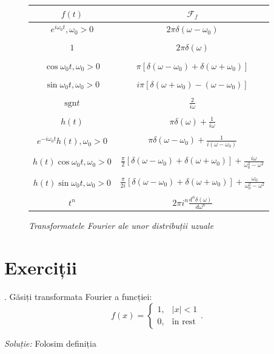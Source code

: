 \documentclass[12pt,a4paper]{article}
\newcommand\kal{\mathcal}
\theoremstyle{dotless}
\theoremstyle{dotlessdr}
\begin{document}
\begin{figure}[!htbp]
  \centering
  \begin{tabular}{|c|c|}
    $ f(t) $ & $ \kal{F}_f $ \\
    \hline\hline
    $ e^{i \omega_0 t}, \omega_0 > 0 $ & $ 2 \pi \delta(\omega - \omega_0) $ \\ & \\
    $ 1 $ & $ 2 \pi \delta(\omega) $ \\ & \\
    $ \cos \omega_0 t, \omega_0 > 0 $ & $ \pi[\delta(\omega - \omega_0) + \delta(\omega + \omega_0)] $ \\ & \\
    $ \sin \omega_0 t, \omega_0 > 0 $ & $ i\pi[\delta(\omega + \omega_0) - (\omega - \omega_0)] $ \\ & \\
    $ \mathrm{sgn} t$ & $ \frac{2}{i \omega} $ \\ & \\
    $ h(t) $ & $ \pi \delta(\omega) + \frac{1}{i \omega} $ \\ & \\
    $ e^{-i \omega_0 t} h(t), \omega_0 > 0 $ & $ \pi \delta(\omega - \omega_0) + \frac{1}{i(\omega - \omega_0)} $ \\ & \\
    $ h(t) \cos \omega_0 t, \omega_0 > 0 $ & $ \frac{\pi}{2} [ \delta(\omega - \omega_0) + \delta(\omega + \omega_0)] + \frac{i \omega}{\omega_0^2 - \omega^2} $ \\ & \\
    $ h(t) \sin \omega_0 t, \omega_0 > 0 $ & $ \frac{\pi}{2i} [ \delta(\omega - \omega_0) + \delta(\omega + \omega_0)] + \frac{\omega_0}{\omega_0^2 - \omega^2} $ \\ & \\
    $ t^n $ & $ 2 \pi i^n \frac{d^n \delta(\omega)}{d \omega^n} $ \\
    \hline
  \end{tabular}
  \caption{\emph{Transformatele Fourier ale unor distribuții uzuale}}
  \label{fig:transf-f-distr}
\end{figure}


\section*{Exerciții}

\indent{}. Găsiți transformata Fourier a funcției:
\[
  f(x) =
  \begin{cases}
    1, & |x| < 1 \\
    0, & \text{în rest}
  \end{cases}.
\]

\emph{Soluție:} Folosim definiția


  
\end{document}
